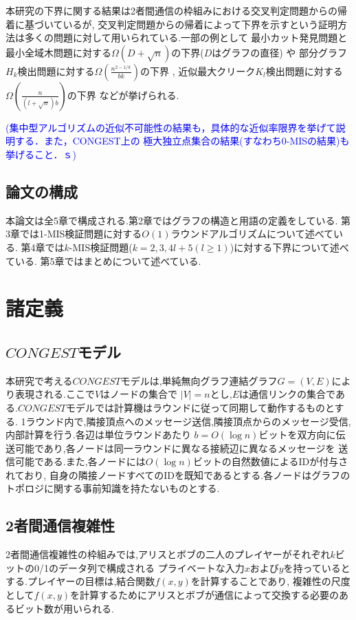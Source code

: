 \documentclass[12pt]{thesis}
\newcommand{\Izumi}[1]{\textcolor{blue}{(#1)}}
\theoremstyle{definition}
\begin{document}
本研究の下界に関する結果は2者間通信の枠組みにおける交叉判定問題からの帰着に基づいているが,
交叉判定問題からの帰着によって下界を示すという証明方法は多くの問題に対して用いられている.一部の例として
最小カット発見問題と最小全域木問題に対する$\Omega (D + \sqrt{n})$の下界($D$はグラフの直径) \cite{sarma2012distributed}や
部分グラフ$H_{k}$検出問題に対する$\Omega \left(\frac{n^{2 - 1/k}}{bk}\right)$の下界 \cite{fischer2018possibilities},
近似最大クリーク$K_{l}$検出問題に対する$\Omega \left(\frac{n}{(l + \sqrt{n})b}\right)$の下界 \cite{czumaj2020detecting}などが挙げられる.

\Izumi{集中型アルゴリズムの近似不可能性の結果も，具体的な近似率限界を挙げて説明する．また，CONGEST上の
極大独立点集合の結果(すなわち0-MISの結果)も挙げること．ｓ}


\section{論文の構成}
本論文は全5章で構成される.第2章ではグラフの構造と用語の定義をしている.
第3章では1-MIS検証問題に対する$O(1)$ラウンドアルゴリズムについて述べている.
第4章では$k$-MIS検証問題($k = 2, 3, 4l + 5 ( l \geq 1)$)に対する下界について述べている.
第5章ではまとめについて述べている.

\chapter{諸定義}

\section{$CONGEST$モデル}
本研究で考える$CONGEST$モデルは,単純無向グラフ連結グラフ$G = (V, E)$により表現される.ここで$V$はノードの集合で
$|V| = n$とし,$E$は通信リンクの集合である.$CONGEST$モデルでは計算機はラウンドに従って同期して動作するものとする.
1ラウンド内で,隣接頂点へのメッセージ送信,隣接頂点からのメッセージ受信,内部計算を行う.各辺は単位ラウンドあたり
$b = O(\log n)$ビットを双方向に伝送可能であり,各ノードは同一ラウンドに異なる接続辺に異なるメッセージを
送信可能である.また,各ノードには$O(\log n)$ビットの自然数値によるIDが付与されており,
自身の隣接ノードすべてのIDを既知であるとする.各ノードはグラフのトポロジに関する事前知識を持たないものとする.

\section{2者間通信複雑性}
2者間通信複雑性の枠組みでは,アリスとボブの二人のプレイヤーがそれぞれ$k$ビットの0/1のデータ列で構成される
プライベートな入力$x$および$y$を持っているとする.プレイヤーの目標は,結合関数$f(x, y)$を計算することであり,
複雑性の尺度として$f(x, y)$を計算するためにアリスとボブが通信によって交換する必要のあるビット数が用いられる.
\end{document}

